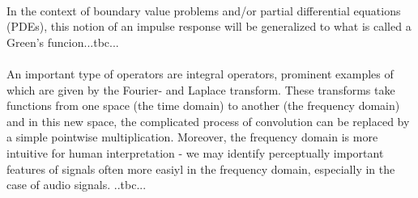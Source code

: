 \paragraph{}
In the context of boundary value problems and/or partial differential equations (PDEs), this notion of an impulse response will be generalized to what is called a Green's funcion...tbc...

\paragraph{}
An important type of operators are integral operators, prominent examples of which are given by the Fourier- and Laplace transform. These transforms take functions from one space (the time domain) to another (the frequency domain) and in this new space, the complicated process of convolution can be replaced by a simple pointwise multiplication. Moreover, the frequency domain is more intuitive for human interpretation - we may identify perceptually important features of signals often more easiyl in the frequency domain, especially in the case of audio signals.
..tbc...

\begin{comment}

-measure theory, Lebesgue integral
-functionals
-distributions, test-functions
-integral transforms (fourier- and laplace trafo)
-greens-functions
-scalar-product, norm, Hilbert-space
-calculus of variations
-operators: eigenvalues, eigenfunctions


\end{comment}